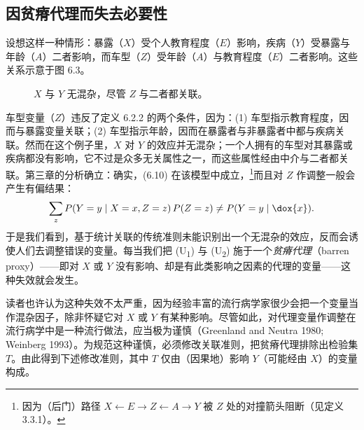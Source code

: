 \subsection{因贫瘠代理而失去必要性}

\begin{example}
设想这样一种情形：暴露（$X$）受个人教育程度（$E$）影响，疾病（$Y$）受暴露与年龄（$A$）二者影响，而车型（$Z$）受年龄（$A$）与教育程度（$E$）二者影响。这些关系示意于图 6.3。
\end{example}

\begin{figure}[htbp]
\centering
{}
\caption{$X$ 与 $Y$ 无混杂，尽管 $Z$ 与二者都关联。}
\label{fig:6.3}
\end{figure}

车型变量（$Z$）违反了定义 6.2.2 的两个条件，因为：(1) 车型指示教育程度，因而与暴露变量关联；(2) 车型指示年龄，因而在暴露者与非暴露者中都与疾病关联。然而在这个例子里，$X$ 对 $Y$ 的效应并无混杂；一个人拥有的车型对其暴露或疾病都没有影响，它不过是众多无关属性之一，而这些属性经由中介与二者都关联。第三章的分析确立：确实，\textup{(6.10)} 在该模型中成立，\footnote{因为（后门）路径 $X\leftarrow E\to Z\leftarrow A\to Y$ 被 $Z$ 处的对撞箭头阻断（见定义 3.3.1）。}而且对 $Z$ 作调整一般会产生有偏结果：
\[
\sum_{z} P(Y=y\mid X=x,Z=z)\,P(Z=z) \ne P(Y=y\mid \dox{x}).
\]
于是我们看到，基于统计关联的传统准则未能识别出一个无混杂的效应，反而会诱使人们去调整错误的变量。每当我们把 (U\textsubscript{1}) 与 (U\textsubscript{2}) 施于一个\emph{贫瘠代理}（barren proxy）——即对 $X$ 或 $Y$ 没有影响、却是有此类影响之因素的代理的变量——这种失效就会发生。

读者也许认为这种失效不太严重，因为经验丰富的流行病学家很少会把一个变量当作混杂因子，除非怀疑它对 $X$ 或 $Y$ 有某种影响。尽管如此，对代理变量作调整在流行病学中是一种流行做法，应当极为谨慎（Greenland and Neutra 1980; Weinberg 1993）。为规范这种谨慎，必须修改关联准则，把贫瘠代理排除出检验集 $T$。由此得到下述修改准则，其中 $T$ 仅由（因果地）影响 $Y$（可能经由 $X$）的变量构成。

